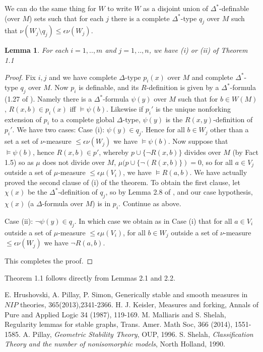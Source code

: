 \documentclass[12pt]{article}
\newtheorem{Lemma}[Theorem]{Lemma}
\begin{document}
We can do the same thing for $W$ to write $W$ as a disjoint union of $\Delta^{*}$-definable (over $M$)  sets such that for each $j$ there is a complete
$\Delta^{*}$-type $q_{j}$ over $M$ such that $\nu(W_{j}\setminus q_{j}) \leq \epsilon\nu(W_{j})$.

\begin{Lemma} For each $i=1,..,m$ and $j=1,..,n$, we have (i) or (ii) of Theorem 1.1
\end{Lemma} 
\begin{proof} Fix $i,j$ and we have complete $\Delta$-type $p_{i}(x)$ over $M$ and complete $\Delta^{*}$-type $q_{j}$ over $M$. Now $p_{i}$ is definable, and  its $R$-definition is given by a $\Delta^{*}$-formula (1.27 of \cite{Pillay}). Namely there is a $\Delta^{*}$-formula $\psi(y)$ over $M$ such that for $b\in W(M)$, $R(x,b)\in p_{i}(x)$ iff $\models \psi(b)$.  Likewise if $p_{i}'$ is the unique nonforking  extension of $p_{i}$ to a complete global $\Delta$-type, $\psi(y)$ is the $R(x,y)$-definition of $p_{i}'$.  We have two cases:
\newline
Case (i):  $\psi(y)\in q_{j}$.
\newline
Hence for all $b\in W_{j}$ other than a set a set of $\nu$-measure $\leq \epsilon \nu(W_{j})$ we have $\models \psi(b)$. 
Now suppose that $\models \psi(b)$, hence $R(x,b)\in p'$, whereby $p\cup \{\neg R(x,b)\}$ divides over $M$ (by Fact 1.5) so as $\mu$ does not divide over $M$,  $\mu(p\cup\{\neg(R(x,b)\}) = 0$, so for all $a\in V_{j}$ outside a set of $\mu$-measure $\leq \epsilon \mu(V_{i})$, we have $\models R(a,b)$.  We have actually proved the second clause of  (i) of the theorem. To obtain the first clause, let $\chi(x)$ be the $\Delta^{*}$-definition of $q_{j}$, so by Lemma 2.8 of \cite{Pillay}, and our case hypothesis, $\chi(x)$ (a $\Delta$-formula over $M$) is in $p_{i}$. Continue as above.

\vspace{2mm}
\noindent
Case (ii): $\neg\psi(y)\in q_{j}$. In which case we obtain as in Case (i) that for all $a\in V_{i}$ outside a set of $\mu$-measure $\leq \epsilon\mu(V_{i})$, for all $b\in W_{j}$ outside a set of $\nu$-measure $\leq \epsilon \nu(W_{j})$ we have $\neg R(a,b)$.  

This completes the proof.




\end{proof} 

Theorem 1.1 follows directly from Lemmas 2.1 and 2.2.


\begin{thebibliography}{99}
 E. Hrushovski, A. Pillay, P. Simon, Generically stable and smooth measures in $NIP$ theories, 365(2013),2341-2366.
 H. J. Keisler, Measures and forking, Annals of Pure and Applied Logic 34 (1987), 119-169.
 M. Malliaris and S. Shelah, Regularity lemmas for stable graphs, Trans. Amer. Math Soc, 366 (2014), 1551-1585.
  A. Pillay, {\em Geometric Stability Theory}, OUP, 1996.
  S. Shelah, {\em Classification Theory and the number of nonisomorphic models}, North Holland, 1990.



\end{thebibliography}
\end{document}
